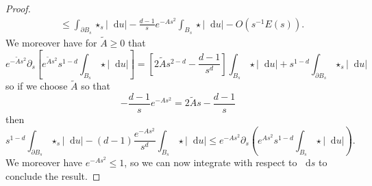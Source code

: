 \documentclass[reqno,10pt]{amsart}
\newcommand*\dif{\mathop{}\!\mathrm{d}}
\theoremstyle{definition}
\numberwithin{equation}{section}
\begin{document}
\begin{proof}
\begin{align*}
&\leq \int_{\partial B_s} \star_s |\dif u| - \frac{d - 1}{s} e^{-As^2} \int_{B_s} \star |\dif u| - O(s^{-1}E(s)).
\end{align*}
We moreover have for $\tilde A \geq 0$ that
$$e^{-\tilde As^2} \partial_s \left[e^{\tilde As^2} s^{1 - d} \int_{B_s} \star |\dif u|\right] = \left[2\tilde As^{2 - d} - \frac{d - 1}{s^d}\right]\int_{B_s} \star |\dif u| + s^{1 - d} \int_{\partial B_s} \star_s |\dif u|$$
so if we choose $\tilde A$ so that
$$-\frac{d - 1}{s} e^{-As^2} = 2\tilde As - \frac{d - 1}{s}$$
then
$$s^{1 - d} \int_{\partial B_s} \star_s |\dif u| - (d - 1)\frac{e^{-As^2}}{s^d} \int_{B_s} \star|\dif u| \leq e^{-As^2} \partial_s\left(e^{As^2} s^{1 - d} \int_{B_s} \star|\dif u|\right).$$
We moreover have $e^{-As^2} \leq 1$, so we can now integrate with respect to $\dif s$ to conclude the result.
\end{proof}
\end{document}
